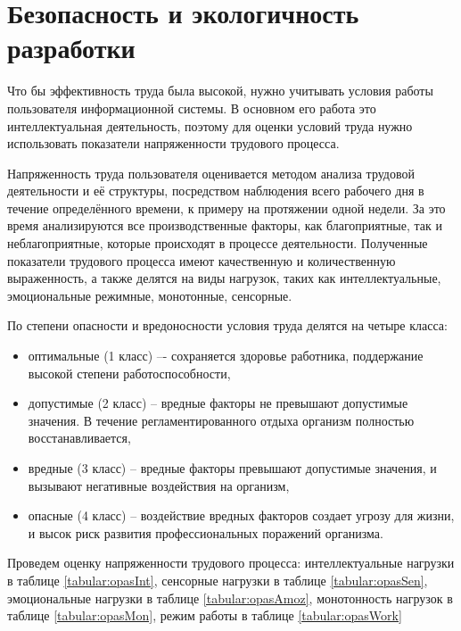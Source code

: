 \section{Безопасность и экологичность разработки}
Что бы эффективность труда была высокой, нужно учитывать условия работы пользователя информационной системы. В основном его работа это интеллектуальная деятельность, поэтому для оценки условий труда нужно использовать показатели напряженности трудового процесса. 

Напряженность труда пользователя оценивается методом анализа трудовой деятельности и её структуры, посредством наблюдения всего рабочего дня в течение определённого времени, к примеру на протяжении одной недели. За это время анализируются все производственные факторы, как благоприятные, так и неблагоприятные, которые происходят в процессе деятельности. Полученные показатели трудового процесса имеют качественную и количественную выраженность, а также делятся на виды нагрузок, таких как интеллектуальные, эмоциональные режимные, монотонные, сенсорные. 

По степени опасности и вредоносности условия труда делятся на четыре класса:
\begin{itemize}
    \item оптимальные (1 класс) –- сохраняется здоровье работника, поддержание высокой степени работоспособности,
    \item допустимые (2 класс) -- вредные факторы не превышают допустимые значения. В течение регламентированного отдыха организм полностью восстанавливается,
    \item вредные (3 класс) -- вредные факторы превышают допустимые значения, и вызывают негативные воздействия на организм,
    \item опасные (4 класс) -- воздействие вредных факторов создает угрозу для жизни, и высок риск развития профессиональных поражений организма.
\end{itemize}

Проведем оценку напряженности трудового процесса: интеллектуальные нагрузки в таблице \ref{tabular:opasInt}, сенсорные нагрузки в таблице \ref{tabular:opasSen}, эмоциональные нагрузки в таблице \ref{tabular:opasAmoz}, монотонность нагрузок в таблице \ref{tabular:opasMon}, режим работы в таблице \ref{tabular:opasWork}

